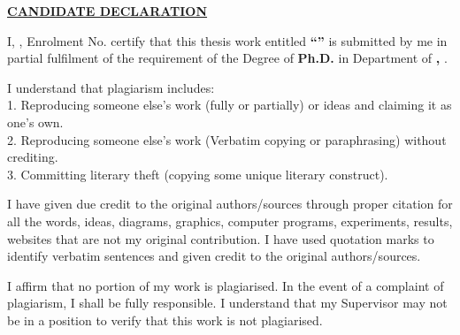 
\begin{declaration}
	
	\vspace{0.2cm}
	\begin{center}
		\textbf{\underline{CANDIDATE DECLARATION}}
	\end{center}
	
	\noindent
	I, \textbf{\authorname}, Enrolment No. \textbf{\enrollno} certify that this thesis work entitled \textbf{``\ttitle''} is submitted by me in partial fulfilment of the requirement of the Degree of \textbf{Ph.D.} in Department of \textbf{\deptname, \collegename}. 
	
	\vspace{0.3cm}
	
	\noindent
	I understand that plagiarism includes:\\
	1. Reproducing someone else's work (fully or partially) or ideas and claiming it as one's own.\\
	2. Reproducing someone else's work (Verbatim copying or paraphrasing) without crediting.\\
	3. Committing literary theft (copying some unique literary construct).
	
	\vspace{0.3cm}
	\noindent
	I have given due credit to the original authors/sources through proper citation for all the words, ideas, diagrams, graphics, computer programs, experiments, results, websites that are not my original contribution. I have used quotation marks to identify verbatim sentences and given credit to the original authors/sources.
	
	\vspace{0.3cm}
	\noindent
	I affirm that no portion of my work is plagiarised. In the event of a complaint of plagiarism, I shall be fully responsible. I understand that my Supervisor may not be in a position to verify that this work is not plagiarised.
	
	

\end{declaration}
